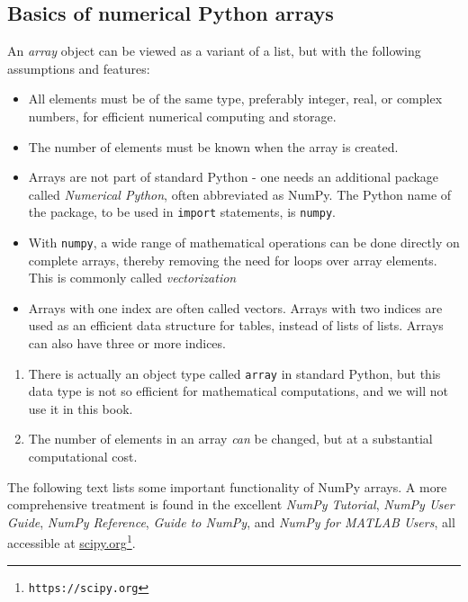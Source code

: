 \documentclass[graybox,sectrefs,envcountresetchap,open=right,final]{svmonodo}
\newenvironment{notice_mdfboxadmon}[1][]{
\begin{notice_mdfboxmdframed}[frametitle=#1]
}
{
\end{notice_mdfboxmdframed}
}
\begin{document}
\subsection{Basics of numerical Python arrays}
\label{sec:plot:array:basics}
  
 
An \emph{array} object can be viewed as a variant of a list, but with the
following assumptions and features:
\begin{itemize}
  \item All elements must be of the same type, preferably integer, real, or complex numbers, for efficient numerical computing and storage.
  \item The number of elements must be known when the array is created.
  \item Arrays are not part of standard Python - one needs an additional package called \emph{Numerical Python}, often abbreviated as NumPy. The Python name of the package, to be used in \texttt{import} statements, is \texttt{numpy}.
  \item With \texttt{numpy}, a wide range of mathematical operations can be done directly on complete arrays, thereby removing the need for loops over array elements. This is commonly called \emph{vectorization} %
  \item Arrays with one index are often called vectors. Arrays with two indices are used as an efficient data structure for tables, instead of lists of lists. Arrays can also have three or more indices.
\end{itemize}
\noindent

\begin{notice_mdfboxadmon}[Remarks]
\begin{enumerate}
\item There is actually an object type called \texttt{array} in standard Python, but this data type is not so efficient for mathematical computations, and we will not use it in this book.
\item The number of elements in an array \emph{can} be changed, but at a substantial computational cost.
\end{enumerate}
\noindent
\end{notice_mdfboxadmon} %


The following text lists some important functionality of NumPy arrays.
A more comprehensive treatment is found in the excellent \emph{NumPy
Tutorial}, \emph{NumPy User Guide}, \emph{NumPy Reference}, \emph{Guide to NumPy},
and \emph{NumPy for MATLAB Users}, all accessible at \href{{https://scipy.org}}{scipy.org}\footnote{\texttt{https://scipy.org}}.
 
 
\end{document}
